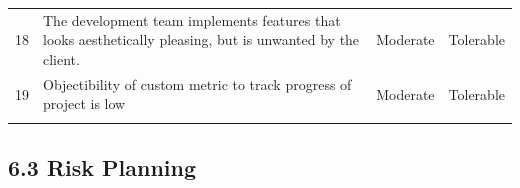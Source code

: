 \documentclass[]{article}
\begin{document}
\begin{longtable}[c]{@{}llll@{}}
\\\addlinespace
\begin{minipage}[t]{0.22\columnwidth}\raggedright
18
\end{minipage} & \begin{minipage}[t]{0.22\columnwidth}\raggedright
The development team implements features that looks aesthetically
pleasing, but is unwanted by the client.
\end{minipage} & \begin{minipage}[t]{0.22\columnwidth}\raggedright
Moderate
\end{minipage} & \begin{minipage}[t]{0.22\columnwidth}\raggedright
Tolerable
\end{minipage}
\\\addlinespace
\begin{minipage}[t]{0.22\columnwidth}\raggedright
19
\end{minipage} & \begin{minipage}[t]{0.22\columnwidth}\raggedright
Objectibility of custom metric to track progress of project is low
\end{minipage} & \begin{minipage}[t]{0.22\columnwidth}\raggedright
Moderate
\end{minipage} & \begin{minipage}[t]{0.22\columnwidth}\raggedright
Tolerable
\end{minipage}
\\\addlinespace
\bottomrule
\end{longtable}
\subsection{6.3 Risk Planning}\label{risk-planning}
\end{document}
